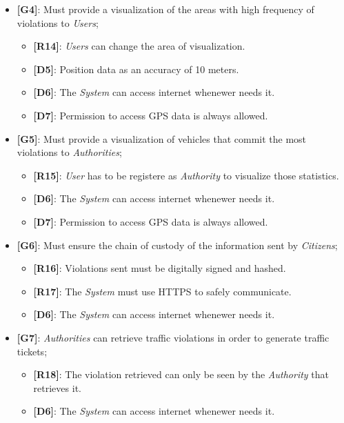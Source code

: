 \documentclass{article}
\begin{document}
\begin{itemize}
    \item \textbf{[G4]}: Must provide a visualization of the areas with high frequency of violations to \textit{Users};
    \begin{itemize}
        \item \textbf{[R14]}: \textit{Users} can change the area of visualization.
        \item \textbf{[D5]}: Position data as an accuracy of 10 meters.
        \item \textbf{[D6]}: The \textit{System} can access internet whenewer needs it.
        \item \textbf{[D7]}: Permission to access GPS data is always allowed.
    \end{itemize}

    \item \textbf{[G5]}: Must provide a visualization of vehicles that commit the most violations to \textit{Authorities}; 
    \begin{itemize}
        \item \textbf{[R15]}: \textit{User} has to be registere as \textit{Authority} to visualize those statistics. 
        \item \textbf{[D6]}: The \textit{System} can access internet whenewer needs it.
        \item \textbf{[D7]}: Permission to access GPS data is always allowed.
    \end{itemize}

    \item \textbf{[G6]}: Must ensure the chain of custody of the information sent by \textit{Citizens};
    \begin{itemize}
        \item \textbf{[R16]}: Violations sent must be digitally signed and hashed.
        \item \textbf{[R17]}: The \textit{System} must use HTTPS to safely communicate.
        \item \textbf{[D6]}: The \textit{System} can access internet whenewer needs it.
    \end{itemize}

    \item \textbf{[G7]}: \textit{Authorities} can retrieve traffic violations in order to generate traffic tickets;
    \begin{itemize}
        \item \textbf{[R18]}: The violation retrieved can only be seen by the \textit{Authority} that retrieves it.
        \item \textbf{[D6]}: The \textit{System} can access internet whenewer needs it.
    \end{itemize}


\end{itemize}
\end{document}
